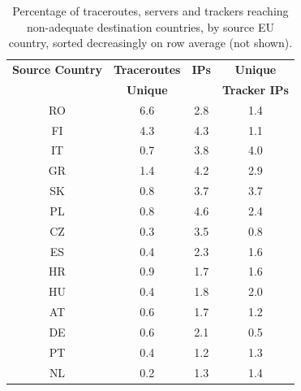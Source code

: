 \begin{table}
  \caption{Percentage of traceroutes, servers and trackers reaching non-adequate destination countries, by source EU country, sorted decreasingly on row average (not shown).}
  \label{tab:countriesheat}

\begin{tabular}{cccc}
    \toprule
    \textbf{Source Country} & \textbf{Traceroutes}  & \textbf{IPs} & \textbf{Unique} \\
     & \textbf{Unique} &  & \textbf{Tracker IPs} \\
    \toprule
    RO & \cellcolor{green!100}6.6 & \cellcolor{green!42.42}2.8 & \cellcolor{green!21.21}1.4 \\
    \midrule
    FI & \cellcolor{green!65.15}4.3 & \cellcolor{green!65.15}4.3 & \cellcolor{green!16.67}1.1 \\
    \midrule
    IT & \cellcolor{green!10.61}0.7 & \cellcolor{green!57.58}3.8 & \cellcolor{green!60.61}4.0 \\
    \midrule
    GR & \cellcolor{green!21.21}1.4 & \cellcolor{green!63.64}4.2 & \cellcolor{green!43.94}2.9 \\
    \midrule
    SK & \cellcolor{green!12.12}0.8 & \cellcolor{green!56.06}3.7 & \cellcolor{green!56.06}3.7 \\
    \midrule
    PL & \cellcolor{green!12.12}0.8 & \cellcolor{green!69.70}4.6 & \cellcolor{green!36.36}2.4 \\
    \midrule
    CZ & \cellcolor{green!4.55}0.3 & \cellcolor{green!53.03}3.5 & \cellcolor{green!12.12}0.8 \\
    \midrule
    ES & \cellcolor{green!6.06}0.4 & \cellcolor{green!34.85}2.3 & \cellcolor{green!24.24}1.6 \\
    \midrule
    HR & \cellcolor{green!13.64}0.9 & \cellcolor{green!25.76}1.7 & \cellcolor{green!24.24}1.6 \\
    \midrule
    HU & \cellcolor{green!6.06}0.4 & \cellcolor{green!27.27}1.8 & \cellcolor{green!30.30}2.0 \\
    \midrule
    AT & \cellcolor{green!9.09}0.6 & \cellcolor{green!25.76}1.7 & \cellcolor{green!18.18}1.2 \\
    \midrule
    DE & \cellcolor{green!9.09}0.6 & \cellcolor{green!31.82}2.1 & \cellcolor{green!7.58}0.5 \\
    \midrule
    PT & \cellcolor{green!6.06}0.4 & \cellcolor{green!18.18}1.2 & \cellcolor{green!19.70}1.3 \\
    \midrule
    NL & \cellcolor{green!3.03}0.2 & \cellcolor{green!19.70}1.3 & \cellcolor{green!21.21}1.4 \\

\end{tabular}
\end{table}
